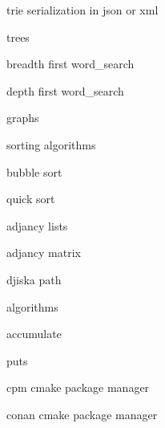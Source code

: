          trie serialization in json or xml 
        
         trees 
        
         breadth first word_search 
        
         depth first word_search 
        
         graphs 
        
         sorting algorithms 
        
         bubble sort 
        
         quick sort 
        
         adjancy lists
        
         adjancy matrix 
        
         djiska path 
        
         algorithms 
        
         accumulate
        
         puts 
        
         cpm cmake package manager
        
         conan cmake package manager
